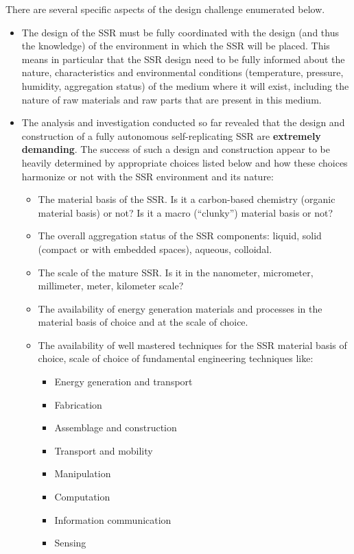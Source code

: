 There are several specific aspects of the design challenge enumerated
below.

\begin{itemize}
\item The design of the SSR must be fully coordinated with the design
(and thus the knowledge) of the environment in which the SSR will be
placed. This means in particular that the SSR design need to be fully
informed about the nature, characteristics and environmental conditions
(temperature, pressure, humidity, aggregation status) of the medium
where it will exist, including the nature of raw materials and raw
parts that are present in this medium.
\item The analysis and investigation conducted so far revealed that the
design and construction of a fully autonomous self-replicating SSR are
\textbf{extremely demanding}. The success of such a design and
construction appear to be heavily determined by appropriate choices
listed below and how these choices harmonize or not with the SSR
environment and its nature:

\begin{itemize}
\item The material basis of the SSR. Is it a carbon-based chemistry
(organic material basis) or not?  Is it a macro (“clunky”) material
basis or not?
\item The overall aggregation status of the SSR components: liquid,
solid (compact or with embedded spaces), aqueous, colloidal.
\item The scale of the mature SSR. Is it in the nanometer, micrometer,
millimeter, meter, kilometer scale?
\item The availability of energy generation materials and processes in
the material basis of choice and at the scale of choice.
\item The availability of well mastered techniques for the SSR material
basis of choice, scale of choice of fundamental engineering techniques
like:

\begin{itemize}
\item Energy generation and transport
\item Fabrication
\item Assemblage and construction
\item Transport and mobility
\item Manipulation
\item Computation
\item Information communication
\item Sensing
\end{itemize}
\end{itemize}
\end{itemize}

